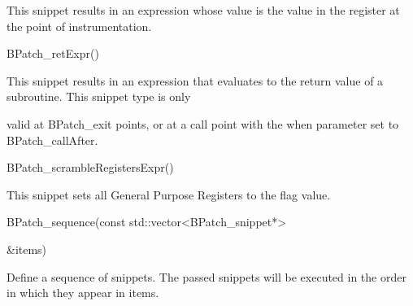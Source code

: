 {{{{{{This snippet results in an expression whose value is the value in the register at the point of instrumentation.}





\bigskip



{

BPatch_retExpr()}



{

This snippet results in an expression that evaluates to the return value of a subroutine. This snippet type is only

valid at BPatch_exit points, or at a call point with the when parameter set to BPatch_callAfter.}





\bigskip





\bigskip





\bigskip





\bigskip



{

BPatch_scrambleRegistersExpr()}



{

This snippet sets all General Purpose Registers to the flag value.}





\bigskip



{

BPatch_sequence(const std::vector<BPatch_snippet*>

&items)}



{

Define a sequence of snippets. The passed snippets will be executed in the order in which they appear in items.





\bigskip



{

}}}}}}}
